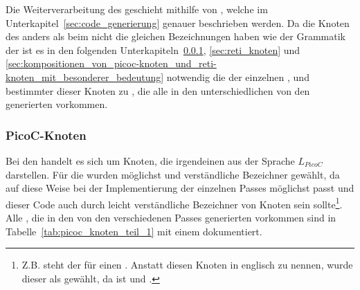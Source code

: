 Die Weiterverarbeitung des  geschieht mithilfe von , welche im Unterkapitel~\ref{sec:code_generierung} genauer beschrieben werden. Da die Knoten des  anders als beim  nicht die gleichen Bezeichnungen haben wie  der Grammatik der  ist es in den folgenden Unterkapiteln~\ref{sec:picoc_knoten}, \ref{sec:reti_knoten} und \ref{sec:kompositionen_von_picoc-knoten_und_reti-knoten_mit_besonderer_bedeutung} notwendig die  der einzelnen ,  und bestimmter  dieser Knoten zu , die alle in den unterschiedlichen von den  generierten  vorkommen.

\subsubsection{PicoC-Knoten}
\label{sec:picoc_knoten}

Bei den  handelt es sich um Knoten, die irgendeinen  aus der Sprache $L_{PicoC}$ darstellen. Für die  wurden möglichst  und  verständliche Bezeichner gewählt, da auf diese Weise bei der Implementierung der einzelnen Passes möglichst  passt und dieser Code auch durch leicht verständliche Bezeichner von Knoten  sein sollte\footnote{Z.B. steht der   für einen . Anstatt diesen Knoten in englisch  zu nennen, wurde dieser als  gewählt, da   ist und .}. Alle , die in den von den verschiedenen Passes generierten  vorkommen sind in Tabelle~\ref{tab:picoc_knoten_teil_1} mit einem  dokumentiert.

